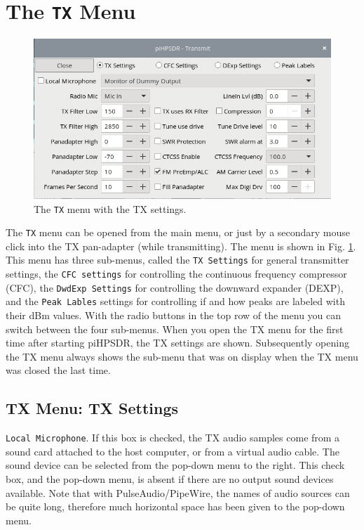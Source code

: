 \documentclass[12pt]{book}
\def\rett#1{\texttt{\color{red}#1}}
\def\bltt#1{\texttt{\color{blue}#1}}
\def\pH{pi\-HPSDR\xspace}
\begin{document}
\section{The \texttt{TX} Menu}
\label{sec:txmenu}
\begin{figure}[ht!]
\center
\includegraphics[scale=0.45]{TXMenu.png}
\caption{The \bltt{TX} menu with the TX settings.}
\label{fig:TXMenu}
\end{figure}

The \bltt{TX} menu can be opened from the main menu, or just by a secondary mouse click
into the TX pan-adapter (while transmitting). The menu is shown in Fig. \ref{fig:TXMenu}.
This menu has three sub-menus, called the \rett{TX Settings} for general transmitter settings,
the \rett{CFC settings} for controlling the continuous frequency compressor (CFC),  the
\rett{DwdExp Settings} for controlling the downward expander (DEXP), and the \rett{Peak Lables}
settings for controlling if and how peaks are labeled with their dBm values. With the radio buttons
in the top row of the menu you can switch between the four sub-menus. When you open the TX
menu for the first time after starting \pH, the TX settings are shown. Subsequently opening
the TX menu always shows the sub-menu that was on display when the TX  menu was closed the last
time.

\subsection{TX Menu: TX Settings}

\rett{Local Microphone}. If this box is checked, the TX audio samples come from a sound card
attached to the host computer, or from a virtual audio cable. The sound device can be
selected from the pop-down menu to the right.
This check box, and the pop-down menu, is absent if
there are no output sound devices available. Note that with PulseAudio/PipeWire, the
names of audio sources can be quite long, therefore much horizontal space has been
given to the pop-down menu.
\end{document}
